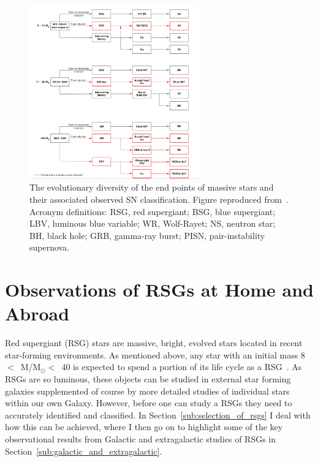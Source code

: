  \begin{figure}
 \centering
 \includegraphics[width=0.65\textwidth]{intro/Smartt09fig12}
 \caption[Endpoints of massive stars]{The evolutionary diversity of the end points of massive stars and their associated observed SN classification. Figure reproduced from~\cite{Smartt09}. Acronym definitions: RSG, red supergiant; BSG, blue supergiant; LBV, luminous blue variable; WR, Wolf-Rayet; NS, neutron star; BH, black hole; GRB, gamma-ray burst; PISN, pair-instability supernova.
 \label{fig:SNe-Smartt}}
\end{figure}


\section{Observations of RSGs at Home and Abroad} %
\label{sec:rsg_observations}

Red supergiant (RSG) stars are massive, bright, evolved stars located in recent star-forming environments.
As mentioned above, any star with an initial mass 8~$<$~M/M$_{\odot}<$~40 is expected to spend a portion of its life cycle as a RSG~\citep{2000A&A...361..101M,Massey03, 2007ARA&A..45..177C, Meynet11}.
As RSGs are so luminous, these objects can be studied in external star forming galaxies supplemented of course by more detailed studies of individual stars within our own Galaxy.
However, before one can study a RSGs they need to accurately identified and classified. In Section~\ref{sub:selection_of_rsgs} I deal with how this can be achieved, where I then go on to highlight some of the key observational results from Galactic and extragalactic studies of RSGs in Section~\ref{sub:galactic_and_extragalactic}.

